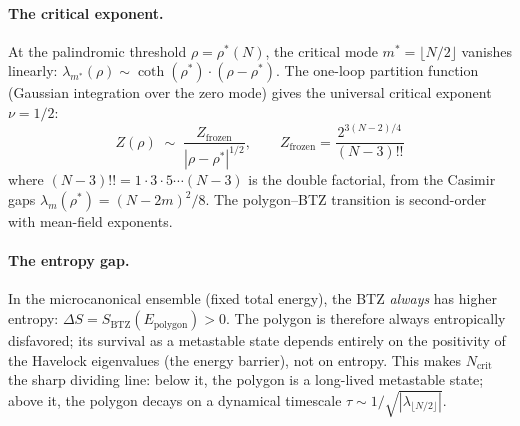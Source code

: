 \paragraph{The critical exponent.}
At the palindromic threshold $\rho = \rho^*(N)$, the critical mode
$m^* = \lfloor N/2\rfloor$ vanishes linearly:
$\lambda_{m^*}(\rho) \sim \coth(\rho^*) \cdot (\rho - \rho^*)$.
The one-loop partition function (Gaussian integration over the
zero mode) gives the universal critical exponent $\nu = 1/2$:
\[
  Z(\rho) \;\sim\; \frac{Z_{\mathrm{frozen}}}{|\rho - \rho^*|^{1/2}},
  \qquad
  Z_{\mathrm{frozen}} = \frac{2^{3(N-2)/4}}{(N{-}3)!!}
\]
where $(N{-}3)!! = 1 \cdot 3 \cdot 5 \cdots (N{-}3)$ is the double
factorial, from the Casimir gaps $\lambda_m(\rho^*) = (N{-}2m)^2/8$.
The polygon--BTZ transition is second-order with mean-field exponents.

\paragraph{The entropy gap.}
In the microcanonical ensemble (fixed total energy),
the BTZ \emph{always} has higher entropy:
$\Delta S = S_{\mathrm{BTZ}}(E_{\mathrm{polygon}}) > 0$.
The polygon is therefore always entropically disfavored;
its survival as a metastable state depends entirely on the
positivity of the Havelock eigenvalues (the energy barrier),
not on entropy.
This makes $N_{\mathrm{crit}}$ the sharp dividing line:
below it, the polygon is a long-lived metastable state;
above it, the polygon decays on a dynamical timescale
$\tau \sim 1/\sqrt{|\lambda_{\lfloor N/2\rfloor}|}$.

